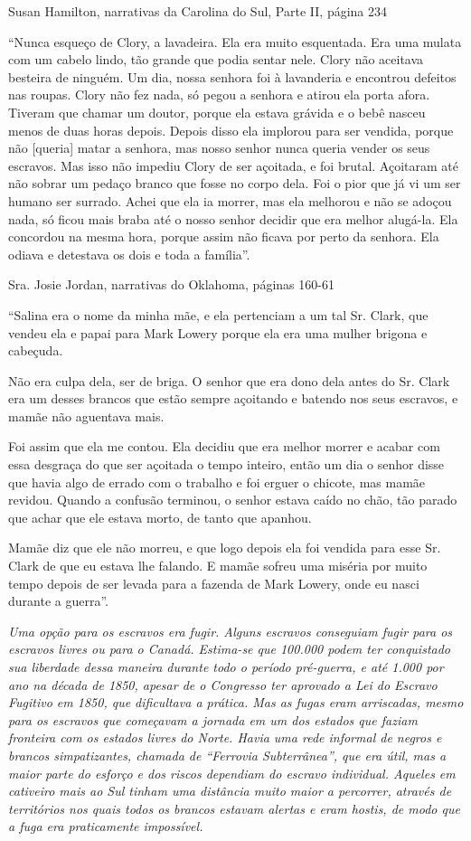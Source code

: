 Susan Hamilton, narrativas da Carolina do Sul, Parte II, página 234

``Nunca esqueço de Clory, a lavadeira. Ela era muito esquentada. Era uma
mulata com um cabelo lindo, tão grande que podia sentar nele. Clory não
aceitava besteira de ninguém. Um dia, nossa senhora foi à lavanderia e
encontrou defeitos nas roupas. Clory não fez nada, só pegou a senhora e
atirou ela porta afora. Tiveram que chamar um doutor, porque ela estava
grávida e o bebê nasceu menos de duas horas depois. Depois disso ela
implorou para ser vendida, porque não {[}queria{]} matar a senhora, mas
nosso senhor nunca queria vender os seus escravos. Mas isso não impediu
Clory de ser açoitada, e foi brutal. Açoitaram até não sobrar um pedaço
branco que fosse no corpo dela. Foi o pior que já vi um ser humano ser
surrado. Achei que ela ia morrer, mas ela melhorou e não se adoçou nada,
só ficou mais braba até o nosso senhor decidir que era melhor alugá-la.
Ela concordou na mesma hora, porque assim não ficava por perto da
senhora. Ela odiava e detestava os dois e toda a família''.

Sra. Josie Jordan, narrativas do Oklahoma, páginas 160-61

``Salina era o nome da minha mãe, e ela pertenciam a um tal Sr. Clark,
que vendeu ela e papai para Mark Lowery porque ela era uma mulher
brigona e cabeçuda.

Não era culpa dela, ser de briga. O senhor que era dono dela antes do
Sr. Clark era um desses brancos que estão sempre açoitando e batendo nos
seus escravos, e mamãe não aguentava mais.

Foi assim que ela me contou. Ela decidiu que era melhor morrer e acabar
com essa desgraça do que ser açoitada o tempo inteiro, então um dia o
senhor disse que havia algo de errado com o trabalho e foi erguer o
chicote, mas mamãe revidou. Quando a confusão terminou, o senhor estava
caído no chão, tão parado que achar que ele estava morto, de tanto que
apanhou.

Mamãe diz que ele não morreu, e que logo depois ela foi vendida para
esse Sr. Clark de que eu estava lhe falando. E mamãe sofreu uma miséria
por muito tempo depois de ser levada para a fazenda de Mark Lowery, onde
eu nasci durante a guerra''.

\emph{Uma opção para os escravos era fugir. Alguns escravos conseguiam
fugir para os escravos livres ou para o Canadá. Estima-se que 100.000
podem ter conquistado sua liberdade dessa maneira durante todo o período
pré-guerra, e até 1.000 por ano na década de 1850, apesar de o Congresso
ter aprovado a Lei do Escravo Fugitivo em 1850, que dificultava a
prática. Mas as fugas eram arriscadas, mesmo para os escravos que
começavam a jornada em um dos estados que faziam fronteira com os
estados livres do Norte. Havia uma rede informal de negros e brancos
simpatizantes, chamada de ``Ferrovia Subterrânea'', que era útil, mas a
maior parte do esforço e dos riscos dependiam do escravo individual.
Aqueles em cativeiro mais ao Sul tinham uma distância muito maior a
percorrer, através de territórios nos quais todos os brancos estavam
alertas e eram hostis, de modo que a fuga era praticamente impossível.}

